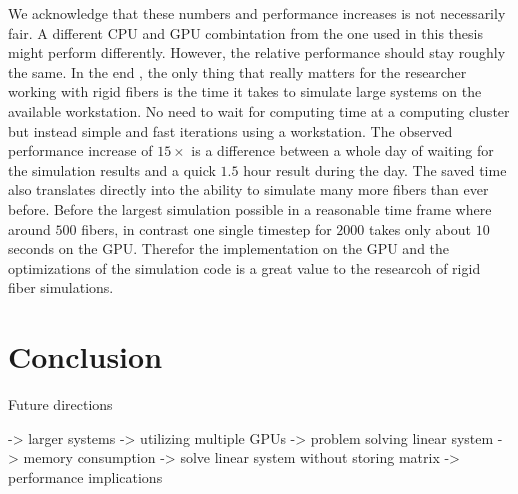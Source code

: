 \documentclass[a4paper,11pt]{kth-mag}
\begin{document}
We acknowledge that these numbers and performance increases is not necessarily fair. A different CPU and GPU combintation from the one used in this thesis might perform differently. However, the relative performance should stay roughly the same. In the end , the only thing that really matters for the researcher working with rigid fibers is the time it takes to simulate large systems on the available workstation. No need to wait for computing time at a computing cluster but instead simple and fast iterations using a workstation. The observed performance increase of $15×$ is a difference between a whole day of waiting for the simulation results and a quick $1.5$ hour result during the day. The saved time also translates directly into the ability to simulate many more fibers than ever before. Before the largest simulation possible in a reasonable time frame where around $500$ fibers, in contrast one single timestep for $2000$ takes only about $10$ seconds on the GPU. Therefor the implementation on the GPU and the optimizations of the simulation code is a great value to the researcoh of rigid fiber simulations.

\chapter{Conclusion}

Future directions

-> larger systems -> utilizing multiple GPUs -> problem solving linear system
-> memory consumption -> solve linear system without storing matrix -> performance implications

\appendix
\addappheadtotoc
\end{document}
